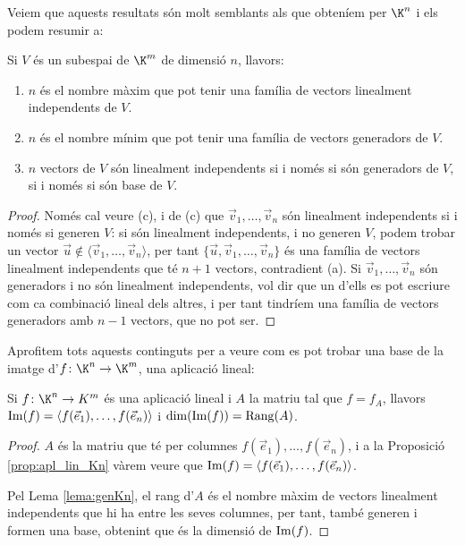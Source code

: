 Veiem que aquests resultats són molt semblants als que obteníem per $\K^n$ i els podem resumir a:
\begin{teorema}\label{teo:baseV}
    Si $V$ és un subespai de $\K^m$ de dimensió $n$, llavors:
    \begin{enumerate}[\rm (a)]
        \item $n$ és el nombre màxim que pot tenir una família de vectors linealment independents de $V$.
        \item $n$ és el nombre mínim que pot tenir una família de vectors generadors de $V$.
        \item $n$ vectors de $V$ són linealment independents si i només si són generadors de $V$, si i només si són base de $V$.
    \end{enumerate}
\end{teorema}
\begin{proof}
Només cal veure (c), i de (c) que $\vec v_1, \dots , \vec v_n$ són linealment independents si i només si generen $V$: si són linealment independents, i no generen $V$, podem trobar un vector $\vec u\not\in\langle \vec v_1,\dots, \vec v_n\rangle$, per tant $\{\vec u, \vec v_1,\dots,\vec v_n\}$ és una família de vectors linealment independents que té $n+1$ vectors, contradient (a). Si $\vec v_1, \dots , \vec v_n$ són generadors i no són linealment independents, vol dir que un d'ells es pot escriure com ca combinació lineal dels altres, i per tant tindríem una família de vectors generadors amb $n-1$ vectors, que no pot ser.
\end{proof}

Aprofitem tots aquests continguts per a veure com es pot trobar una base de la imatge d'$f\colon \K^n\to \K^m$, una aplicació lineal:
\begin{lema}\label{lema:imfA}
    Si $f\colon \K^n \to K^m$ és una aplicació lineal i $A$ la matriu tal que $f=f_A$, llavors $\operatorname{Im}(f)=\langle f(\vec e_1), \dots, f(\vec e_n) \rangle$ i $\dim(\operatorname{Im}(f))=\operatorname{Rang}(A)$.
\end{lema}
\begin{proof}
    $A$ és la matriu que té per columnes $f(\vec e_1), \dots, f(\vec e_n)$, i a la Proposició \ref{prop:apl_lin_Kn} vàrem veure que $\operatorname{Im}(f)=\langle f(\vec e_1), \dots, f(\vec e_n) \rangle$.
    
    Pel Lema \ref{lema:genKn}, el rang d'$A$ és el nombre màxim de vectors linealment independents que hi ha entre les seves columnes, per tant, també generen i formen una base, obtenint que és la dimensió de $\operatorname{Im}(f)$. 
\end{proof}

